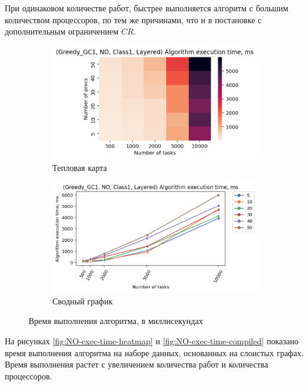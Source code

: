 При одинаковом количестве работ, быстрее выполняется алгоритм с большим количеством процессоров, по тем же причинами, что и в постановке с дополнительным ограничением $CR$. 

\begin{figure}[!htbp]
    \centering
    \begin{subfigure}{0.49\textwidth}
        \includegraphics[width=\textwidth]{imgs/layered_class_1/NO/et_heatmap.png}
        \caption{Тепловая карта}
        \label{fig:NO-layered-exec-time-heatmap}
    \end{subfigure}
    \hfill
    \begin{subfigure}{0.49\textwidth}
        \includegraphics[width=\textwidth]{imgs/layered_class_1/NO/tr_graph.png}
        \caption{Сводный график}
        \label{fig:NO-layered-exec-time-compiled}
    \end{subfigure}
    \caption{Время выполнения алгоритма, в миллисекундах}
\end{figure}

На рисунках \ref{fig:NO-exec-time-heatmap} и \ref{fig:NO-exec-time-compiled} показано время выполнения алгоритма на наборе данных, основанных на слоистых графах. Время выполнения растет с увеличением количества работ и количества процессоров.

